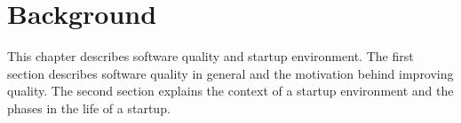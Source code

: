 
 \chapter{Background}
 
This chapter describes software quality and startup environment. The first section describes software quality in general and the motivation behind improving quality. The second section explains the context of a startup environment and the phases in the life of a startup.

 


